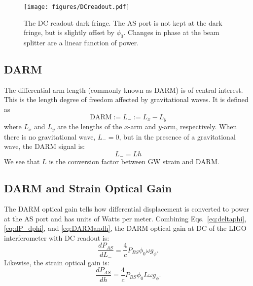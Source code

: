 \begin{figure}
\begin{centering}
\texttt{[image: figures/DCreadout.pdf]}
\caption[The DC readout dark fringe]{The DC readout dark fringe. The
  AS port is not kept at the dark fringe, but is slightly offset by
  $\phi_0$. Changes in phase at the beam splitter are a linear
  function of power.}
\label{fig:DCreadout}
\end{centering}
\end{figure}



\subsection{DARM}
The differential arm length (commonly known as DARM) is of central interest. This
is the length degree of freedom affected by gravitational waves. It is
defined as
\begin{equation}
\mathrm{DARM} := L_- := L_x - L_y
\end{equation}
where $L_x$ and $L_y$ are the lengths of the $x$-arm and $y$-arm,
respectively. When there is no gravitational wave, $L_-=0$, but in the
presence of a gravitational wave, the DARM signal is:
\begin{equation}
L_- = Lh
\label{eq:DARMandh}
\end{equation}
We see that $L$ is the conversion factor between GW strain and DARM.



\subsection{DARM and Strain Optical Gain}
The DARM optical gain tells how differential displacement is converted
to power at the AS port and has units of Watts per meter. Combining
Eqs.~\ref{eq:deltaphi}, \ref{eq:dP_dphi}, and \ref{eq:DARMandh}, the
DARM optical gain at DC of the LIGO interferometer with DC readout is:
\begin{equation}
\frac{d P_{AS}}{dL_-} = \frac{4}{c} P_{BS} \phi_0 \omega g_{\phi}.
\label{eq:opticalgain}
\end{equation} 
Likewise, the strain optical gain is:
\begin{equation}
\frac{d P_{AS}}{dh} = \frac{4}{c} P_{BS} \phi_0 L \omega g_{\phi}.
\label{eq:opticalgain_h}
\end{equation}



